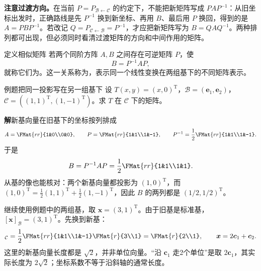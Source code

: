 \documentclass[a4paper,12pt,twoside,openany,fontset=none]{ctexbook}
\newcounter{definition}[chapter]
\newenvironment{definition}[1][]{\begin{defBox}{定义}{#1}}{\end{defBox}}
\newcounter{example}[chapter]
\newenvironment{example}[1][]{\begin{exBox}{例题}{#1}}{\end{exBox}}
\numberwithin{equation}{chapter}
\begin{document}
\textbf{注意过渡方向。}在当前 $P=P_{\mathcal B\leftarrow\mathcal C}$ 的约定下，不能把新矩阵写成 $PAP^{-1}$：从旧坐标出发时，正确路线是先 $P^{-1}$ 换到新坐标、再用 $B$、最后用 $P$ 换回，得到的是 $A=PBP^{-1}$。若改记 $Q=P_{\mathcal C\leftarrow\mathcal B}=P^{-1}$，才应把新矩阵写为 $B=QAQ^{-1}$。两种排列都可出现，但必须同时看清过渡矩阵的方向和中间作用的矩阵。

\begin{definition}[相似矩阵]
若两个同阶方阵 $A,B$ 之间存在可逆矩阵 $P$，使
\[
 B=P^{-1}AP,
\]
就称它们为。这一关系称为，表示同一个线性变换在两组基下的不同矩阵表示。
\end{definition}

\begin{example}[把同一投影写在另一组基下]
设 $T(x,y)=(x,0)^{\mathrm T}$，$\mathcal B=(\mathbf e_1,\mathbf e_2)$，$\mathcal C=((1,1)^{\mathrm T},(1,-1)^{\mathrm T})$。求 $T$ 在 $\mathcal C$ 下的矩阵。
\end{example}
\textbf{解}\quad 新基向量在旧基下的坐标按列排成
\[
 A=\FMat{rr}{1&0\\0&0},\qquad
 P=\FMat{rr}{1&1\\1&-1},\qquad
 P^{-1}=\frac12\FMat{rr}{1&1\\1&-1}.
\]
于是
\[
 B=P^{-1}AP=\frac12\FMat{rr}{1&1\\1&1}.
\]
从基的像也能核对：两个新基向量都投影为 $(1,0)^{\mathrm T}$，而 $(1,0)^{\mathrm T}=\tfrac12(1,1)^{\mathrm T}+\tfrac12(1,-1)^{\mathrm T}$，因此 $B$ 的两列都是 $(1/2,1/2)^{\mathrm T}$。

继续使用例题中的两组基，取 $\boldsymbol x=(3,1)^{\mathrm T}$。由于旧基是标准基，$[\boldsymbol x]_{\mathcal B}=(3,1)^{\mathrm T}$。先换到新基：
\begin{equation}
 [\boldsymbol x]_{\mathcal C}
 =\frac12\FMat{rr}{1&1\\1&-1}\FMat{r}{3\\1}
 =\FMat{r}{2\\1},\qquad
 \boldsymbol x=2\boldsymbol c_1+\boldsymbol c_2.
\end{equation}
这里的新基向量长度都是 $\sqrt2$，并非单位向量。“沿 $\boldsymbol c_1$ 走2个单位”是取 $2\boldsymbol c_1$，其实际长度为 $2\sqrt2$；坐标系数不等于沿斜轴的通常长度。

\newcommand{\FStdAxes}{%
 \draw[fouraxis,FourRose] (-.45,0)--(3.7,0) node[right] {$\mathbf e_1$};
 \draw[fouraxis,FourRose] (0,-.45)--(0,2.55) node[above] {$\mathbf e_2$};
 \node[below left,font=\footnotesize] at (0,0) {$O$};}
\newcommand{\FNewAxes}{%
 \draw[fouraxis,FourBlue] (-.4,-.4)--(2.35,2.35) node[above] {$\boldsymbol c_1$};
 \draw[fouraxis,FourBlue] (-.6,.6)--(1.4,-1.4) node[right] {$\boldsymbol c_2$};
 \fill[FourBlue] (1,1) circle(1.2pt);\fill[FourBlue] (1,-1) circle(1.2pt);
 \node[below left,font=\footnotesize] at (0,0) {$O$};}
\end{document}
